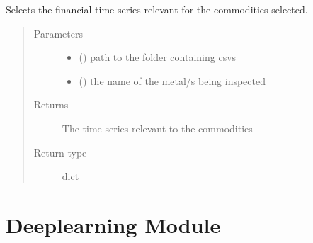 \documentclass[letterpaper,10pt,english]{sphinxmanual}
\begin{document}
\begin{fulllineitems}
\label{\detokenize{index:Forecaster.preprocessing.universe_select}}
Selects the financial time series relevant for the commodities selected.
\begin{quote}\begin{description}
\item[{Parameters}] \leavevmode\begin{itemize}
\item {} 
 () \textendash{} path to the folder containing csvs

\item {} 
 () \textendash{} the name of the metal/s being inspected

\end{itemize}

\item[{Returns}] \leavevmode
The time series relevant to the commodities

\item[{Return type}] \leavevmode
dict

\end{description}\end{quote}

\end{fulllineitems}



\chapter{Deeplearning Module}
\label{\detokenize{index:module-Forecaster.deeplearning}}\label{\detokenize{index:deeplearning-module}}
\end{document}
